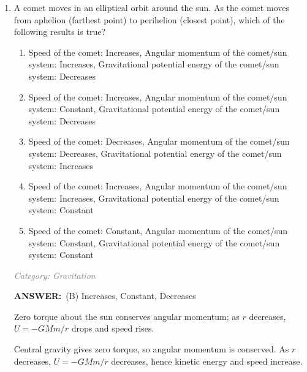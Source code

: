 \documentclass[12pt, a4paper]{article}
\makeatletter
\newcommand{\finalanswer}[1]{\textbf{ANSWER:}~#1}
\newif\if@categoryprinted
\newcommand{\category}[1]{\if@categoryprinted\relax\else\textit{\textcolor{gray}{Category: #1}}\global\@categoryprintedtrue\fi}
\newcommand{\tags}[1]{}
\makeatother
\begin{document}
\begin{CJK*}{UTF8}{gbsn}
\begin{enumerate}[itemsep=1.0em, topsep=0.6em]
\newpage

\item \label{prob:17}
A comet moves in an elliptical orbit around the sun. As the comet moves from aphelion (farthest point) to perihelion (closest point), which of the following results is true?
\begin{enumerate}
    \item Speed of the comet: Increases, Angular momentum of the comet/sun system: Increases, Gravitational potential energy of the comet/sun system: Decreases
    \item Speed of the comet: Increases, Angular momentum of the comet/sun system: Constant, Gravitational potential energy of the comet/sun system: Decreases
    \item Speed of the comet: Decreases, Angular momentum of the comet/sun system: Decreases, Gravitational potential energy of the comet/sun system: Increases
    \item Speed of the comet: Increases, Angular momentum of the comet/sun system: Increases, Gravitational potential energy of the comet/sun system: Constant
    \item Speed of the comet: Constant, Angular momentum of the comet/sun system: Constant, Gravitational potential energy of the comet/sun system: Constant
\end{enumerate}

\category{Gravitation} \tags{}
\begin{answerbox}
\finalanswer{(B) Increases, Constant, Decreases}
\end{answerbox}
\begin{insightbox}
Zero torque about the sun conserves angular momentum; as $r$ decreases, $U=-GMm/r$ drops and speed rises.
\end{insightbox}
\begin{solutionbox}

Central gravity gives zero torque, so angular momentum is conserved. As $r$ decreases, $U=-GMm/r$ decreases, hence kinetic energy and speed increase.
\end{solutionbox}


\end{enumerate}
\end{CJK*}
\end{document}
